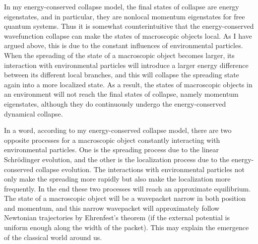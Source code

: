 In my energy-conserved collapse model, the final states of collapse are energy eigenstates, and in particular, they are nonlocal momentum eigenstates for free quantum systems. Thus it is somewhat counterintuitive that the energy-conserved wavefunction collapse can make the states of macroscopic objects local. As I have argued above, this is due to the constant influences of environmental particles. When the spreading of the state of a macroscopic object becomes larger, its interaction with environmental particles will introduce a larger energy difference between its different local branches, and this will collapse the spreading state again into a more localized state.
 As a result, the states of macroscopic objects in an environment will not reach the final states of collapse, namely momentum eigenstates, although they do continuously undergo the energy-conserved dynamical collapse. 

In a word, according to my energy-conserved collapse model, there are two opposite processes for a macroscopic object constantly interacting with environmental particles. One is the spreading process due to the linear Schr\"{o}dinger evolution, and the other is the localization process due to the energy-conserved collapse evolution. The interactions with environmental particles not only make the spreading more rapidly but also make the localization more frequently. In the end these two processes will reach an approximate equilibrium. The state of a macroscopic object will be a wavepacket narrow in both position and momentum, and this narrow wavepacket will approximately follow Newtonian trajectories by Ehrenfest's theorem (if the external potential is uniform enough along the width of the packet). This may explain the emergence of the classical world around us.

